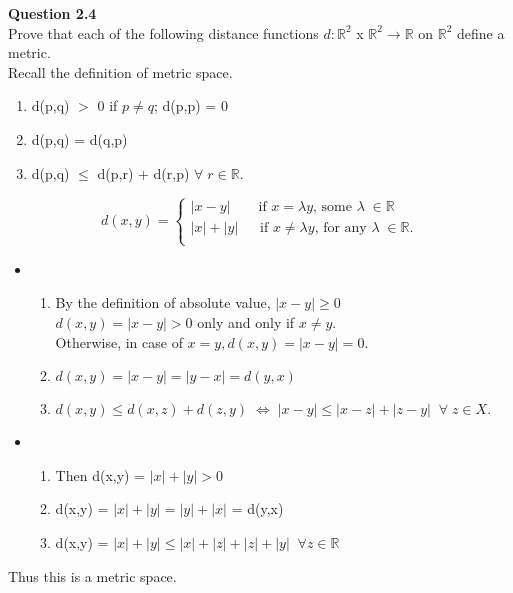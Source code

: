 \documentclass[12pt]{article}
\begin{document}
\newpage
\noindent
\textbf{Question 2.4}\\
Prove that each of the following distance functions $d: \mathbb{R}^2$ x $\mathbb{R}^2 \rightarrow \mathbb{R}$ on $\mathbb{R}^2$ define a metric.\\

\noindent
Recall the definition of metric space.
\begin{enumerate}[label=(\roman*)]
    \item d(p,q) $>$ 0 if $p\neq q$; d(p,p) = 0
    \item d(p,q) = d(q,p)
    \item d(p,q) $\le$ d(p,r) + d(r,p) \;\;$\forall\; r\in \mathbb{R}$.\\
\end{enumerate}

 
    $$
        d(x,y) = 
        \begin{cases}
            |x-y| \qquad \text{if $x = \lambda y$, some $\lambda \; \in \mathbb{R}$}\\
            |x| + |y| \quad\;\; \text{if $x \neq \lambda y$, for any $\lambda\;\in\mathbb{R}$}.\\
        \end{cases}
    $$
    
    \begin{itemize}
        \item {}
            \begin{enumerate}[label=(\roman*)]
                \item By the definition of absolute value, $|x - y| \ge 0$\\
                \Hence $d(x,y) = |x - y| > 0$ only and only if $x \neq y$.\\
                Otherwise, in case of $x = y, d(x,y) = |x- y| = 0.$\\
                \item $d(x,y) = |x - y| = |y - x| = d(y,x)$
                \item $d(x,y) \le d(x,z) + d(z,y)\; \Leftrightarrow \; |x - y| \le |x - z| + |z - y|\;\;
                \forall\; z \in X.$\\
            \end{enumerate}
            
        \item {}
            \begin{enumerate}[label=(\roman*)]
                \item Then d(x,y) = $|x| + |y| > 0$
                \item d(x,y) = $|x| + |y| = |y| + |x|$ = d(y,x)
                \item d(x,y) = $|x| + |y| \le |x| + |z| + |z| + |y|\;\; \forall z \in \mathbb{R}$
            \end{enumerate}
    \end{itemize}
    \indent
        \quad\; Thus this is a metric space.\\
    
\end{document}
